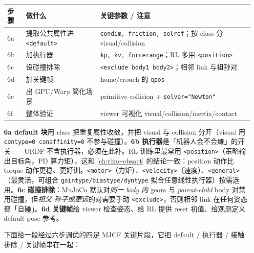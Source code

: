 \begin{center}
\small
\begin{tabular}{@{}llp{4.6cm}@{}}
\toprule
步骤 & 做什么 & 关键参数 / 注意 \\
\midrule
6a & 提取公共属性进 \texttt{<default>} & \texttt{condim, friction, solref}；按 class 分 visual/collision \\
6b & 加执行器 & \texttt{kp, kv, forcerange}；RL 多用 \texttt{<position>} \\
6c & 设碰撞排除 & \texttt{<exclude body1 body2>}；相邻 link 与祖孙对 \\
6d & 加关键帧 & home/crouch 的 \texttt{qpos} \\
6e & 出 GPU/Warp 简化场景 & primitive collision + \texttt{solver="Newton"} \\
6f & 整体验证 & viewer 可视化 visual/collision/inertia/contact \\
\bottomrule
\end{tabular}
\end{center}

\textbf{6a default 块}用 class 把重复属性收敛，并把 visual 与 collision 分开（visual 用 \texttt{contype=0 conaffinity=0} 不参与碰撞）。\textbf{6b 执行器}是「机器人会不会瘫」的开关——URDF 不含执行器，必须在此补。RL 训练里最常用 \texttt{<position>}（策略输出目标角，PD 算力矩），这和 \cref{ch:rlmc-obsact} 的结论一致：position 动作比 torque 动作更稳、更好训。\texttt{<motor>}（力矩）、\texttt{<velocity>}（速度）、\texttt{<general>}（最灵活，可组合 \texttt{gaintype/\allowbreak biastype/\allowbreak dyntype} 拟合任意线性执行器）按需选用。\textbf{6c 碰撞排除}：MuJoCo 默认对\emph{同一 body 内} geom 与 \emph{parent-child} body 对禁用碰撞，但\emph{祖父-孙子或更远}的对需要手动 \texttt{<exclude>}，否则相邻 link 在任何姿态都「自碰」。\textbf{6d 关键帧}给 viewer 检查姿态、给 RL 提供 reset 初值、给观测定义 default pose 参考。

下面给一段经过六步调优的四足 MJCF 关键片段，它把 default / 执行器 / 接触排除 / 关键帧串在一起：

